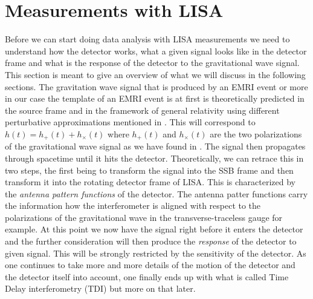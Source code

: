 \section{Measurements with LISA}
Before we can start doing data analysis with LISA measurements we need to understand how the detector works, what a given signal looks like in the detector frame and what is the response of the detector to the gravitational wave signal. This section is meant to give an overview of what we will discuss in the following sections. The gravitation wave signal that is produced by an EMRI event or more in our case the template of an EMRI event is at first is theoretically predicted in the source frame and in the framework of general relativity using different perturbative approximations mentioned in . This will correspond to $h(t) = h_+(t) + h_\times(t)$ where $h_+(t)$ and $h_\times(t)$ are the two polarizations of the gravitational wave signal as we have found in . The signal then propagates through spacetime until it hits the detector. Theoretically, we can retrace this in two steps, the first being to transform the signal into the SSB frame and then transform it into the rotating detector frame of LISA. This is characterized by the \emph{antenna pattern functions} of the detector. The antenna patter functions carry the information how the interferometer is aligned with respect to the polarizations of the gravitational wave in the transverse-traceless gauge for example. At this point we now have the signal right before it enters the detector and the further consideration will then produce the \emph{response} of the detector to given signal. This will be strongly restricted by the sensitivity of the detector.  As one continues to take more and more details of the motion of the detector and the detector itself into account, one finally ends up with what is called Time Delay interferometry (TDI) but more on that later.

